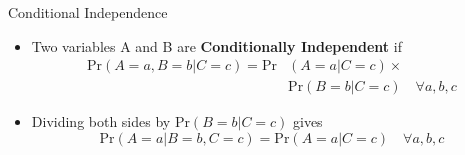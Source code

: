 \documentclass[10pt]{beamer}
\begin{document}
\begin{frame}{Conditional Independence}
  \begin{itemize}
  \item
Two variables A and B are {\bf Conditionally Independent} if
\begin{align}
\mbox{Pr}(A=a,B=b|C=c)=\mbox{Pr}&(A=a|C=c)\times\nonumber\\&\mbox{Pr}(B=b|C=c)\quad\forall a,b,c
\end{align}

\item Dividing both sides by $\mbox{Pr}(B=b|C=c)$ gives
\begin{equation}
\mbox{Pr}(A=a|B=b,C=c)=\mbox{Pr}(A=a|C=c)\quad\forall a,b,c
\end{equation}
  \end{itemize}
\end{frame}
\end{document}
